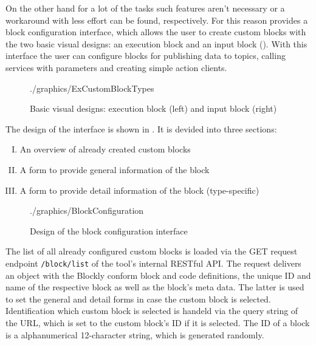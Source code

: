 On the other hand for a lot of the tasks such features aren't necessary or a workaround with less effort can be found, respectively. For this reason \toolname{} provides a block configuration interface, which allows the user to create custom blocks with the two basic visual designs: an execution block and an input block (). With this interface the user can configure blocks for publishing data to topics, calling services with parameters and creating simple action clients.

\begin{figure}[htbp]
	\centering
	\begin{overpic}[width=0.5\linewidth]{./graphics/ExCustomBlockTypes}
	\end{overpic}
	\caption{Basic visual designs: execution block (left) and input block (right)}%
	\label{fig:CustomBlockTypes}%
\end{figure}

The design of the interface is shown in . It is devided into three sections:
\begin{enumerate}[I.]
	\item An overview of already created custom blocks
	\item A form to provide general information of the block
	\item A form to provide detail information of the block (type-specific)
\end{enumerate}

\begin{figure}[htbp]
	\centering
	\begin{overpic}[width=0.8\linewidth]{./graphics/BlockConfiguration}
	\end{overpic}
	\caption{Design of the block configuration interface}%
	\label{fig:BlockConfiguration}%
\end{figure}

The list of all already configured custom blocks is loaded via the GET request endpoint \lstinline!/block/list! of the tool's internal RESTful API. The request delivers an object with the Blockly conform block and code definitions, the unique ID and name of the respective block as well as the block's meta data. The latter is used to set the general and detail forms in case the custom block is selected. Identification which custom block is selected is handeld via the query string of the URL, which is set to the custom block's ID if it is selected. The ID of a block is a alphanumerical 12-character string, which is generated randomly. \\

